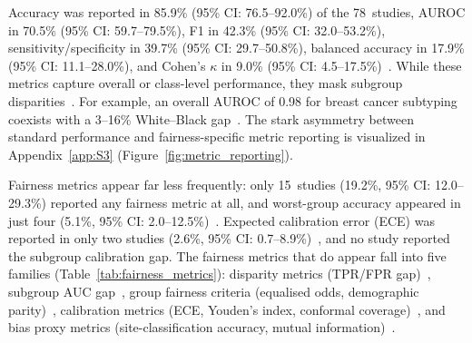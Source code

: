 Accuracy was reported in 85.9\% (95\% CI: 76.5--92.0\%) of the 78~studies, AUROC in 70.5\% (95\% CI: 59.7--79.5\%),
F1 in 42.3\% (95\% CI: 32.0--53.2\%), sensitivity/specificity in 39.7\% (95\% CI: 29.7--50.8\%), balanced accuracy in
17.9\% (95\% CI: 11.1--28.0\%), and Cohen's $\kappa$ in 9.0\% (95\% CI: 4.5--17.5\%)~\citep{campanella2019clinical,
xu2017large, tasci2022bias, asadiaghbolagh2024learning}. While these metrics
capture overall or class-level performance, they mask subgroup
disparities~\citep{chen2023algorithmic, riccilara2022addressing}. For example, an
overall AUROC of 0.98 for breast cancer subtyping coexists with a
3--16\% White--Black gap~\citep{vaidya2024demographic}. The stark asymmetry between standard performance and fairness-specific metric reporting is visualized in Appendix~\ref{app:S3} (Figure~\ref{fig:metric_reporting}).

\label{sec:results:reproducibility}
\label{sec:results:reporting}
Fairness metrics appear far less frequently: only 15~studies (19.2\%, 95\% CI: 12.0--29.3\%) reported any fairness metric at all, and worst-group
accuracy appeared in just four
(5.1\%, 95\% CI: 2.0--12.5\%)~\citep{soltan2024challenges, huang2025knowledge, lin2025contrastive, xu2026spare}.
Expected calibration error (ECE) was reported in only two studies (2.6\%, 95\% CI: 0.7--8.9\%)~\citep{roschewitz2023automatic, park2025uncertainty}, and
no study reported the subgroup calibration gap. The fairness metrics that do appear fall into five
families (Table~\ref{tab:fairness_metrics}): disparity metrics (TPR/FPR
gap)~\citep{vaidya2024demographic, huang2025knowledge,
soltan2024challenges}, subgroup AUC
gap~\citep{vaidya2024demographic,
lin2025contrastive, huang2025knowledge}, group fairness criteria (equalised odds, demographic
parity)~\citep{soltan2024challenges, sufian2024mitigating,
cecconi2024fairness}, calibration metrics (ECE, Youden's index, conformal
coverage)~\citep{roschewitz2023automatic, park2025uncertainty,
olsson2022estimating}, and bias proxy
metrics (site-classification accuracy, mutual
information)~\citep{dehkharghanian2023biased, bidgoli2022bias,
mazaheri2023ranking, kheiri2025investigation, hosseini2023proportionally}.

